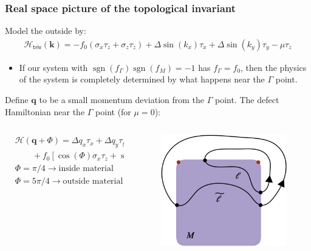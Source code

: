 \documentclass{beamer}
\DeclareMathOperator{\sgn}{sgn}
\newcommand{\ms}{\mathsf}
\renewcommand{\(}{\left(}
\renewcommand{\)}{\right)}
\renewcommand{\[}{\left[}
\renewcommand{\]}{\right]}
\begin{document}
\begin{frame}
    \frametitle{Real space picture of the topological invariant}
    Model the outside by: 
    \begin{align*}
        \mathcal H_{\ms{triv}}(\bm{k})= -f_0(\sigma_x\tau_z + \sigma_z \tau_z) +\Delta \sin(k_x)\tau_x + \Delta \sin(k_y)\tau_y -\mu \tau_z
    \end{align*} \pause
    \begin{itemize}
        \item If our system with $\sgn(f_\Gamma)\sgn(f_M) = -1$ has $f_\Gamma = f_0$, then the physics of the system is completely determined by what happens near the $\Gamma$ point. 
    \end{itemize} \pause
    
    Define $\bm q$ to be a small momentum deviation from the $\Gamma$ point. The defect Hamiltonian near the $\Gamma$ point (for $\mu=0$): 
    \begin{columns}
        \begin{column}{0.6\textwidth}
            \begin{align*}
                &\mathcal H(\bm{q}+ \Phi)=\Delta q_{x}\tau_x + \Delta q_{y}\tau_y\\ 
                &\qquad + f_0 \left[ \cos (\Phi) \sigma_x \tau_z +\sin(\Phi) \sigma_z \tau_z \right] \\ 
                &\Phi = \pi/4 \rightarrow \text{inside material} \\ 
                &\Phi = 5\pi/4 \rightarrow \text{outside material}
            \end{align*}
            
        \end{column}
        \begin{column}{0.4\textwidth}
            \begin{figure}[]
                \centering
                \includegraphics[scale=0.3]{Real_space_path.png}
            \end{figure}
        \end{column}
    \end{columns}

\end{frame}
\end{document}
